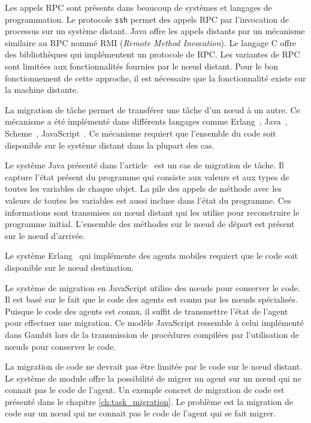 Les appels RPC sont présents dans beaucoup de systèmes et langages de
programmation.  Le protocole \texttt{ssh} permet des appels RPC par
l'invocation de processus sur un système distant. Java offre les appels distants par un
mécanisme similaire au RPC nommé RMI (\textit{Remote Method Invocation}).
Le langage C offre des bibliothèques qui implémentent un protocole de RPC.
Les variantes de RPC sont limitées aux fonctionnalités fournies par le nœud distant.
Pour le bon fonctionnement de cette approche, il est nécessaire que la
fonctionnalité existe sur la machine distante.

La migration de tâche permet de transférer une tâche d'un nœud à un autre.  Ce
mécanisme a été implémenté dans différents langages comme
Erlang~\cite{M_mobileintelligent}, Java~\cite{And98transparentmigration},
Scheme~\cite{Sumii00animplementation},
JavaScript~\cite{DEV2017transparentmigration}. Ce mécanisme requiert que
l'ensemble du code soit disponible sur le système distant dans la plupart des
cas.

Le système Java présenté dans l'article~\cite{And98transparentmigration} est un
cas de migration de tâche. Il capture l'état présent du programme qui consiste
aux valeurs et aux types de toutes les variables de chaque objet. La pile des
appels de méthode avec les valeurs de toutes les
variables est aussi incluse dans l'état du programme.
Ces informations sont transmises au nœud distant qui les utilise pour reconstruire le programme initial.
L'ensemble des méthodes sur le nœud de départ est présent sur le
nœud d'arrivée.

Le système Erlang~\cite{M_mobileintelligent} qui implémente des agents mobiles
requiert que le code soit disponible sur le nœud destination.

Le système de migration en JavaScript utilise des nœuds pour conserver
le code. Il est basé sur le fait que le code des agents est connu par les
nœuds spécialisés. Puisque le code des agents est connu, il suffit de
transmettre l'état de l'agent pour effectuer une migration. Ce modèle
JavaScript ressemble à celui implémenté dans Gambit lors de la transmission
de procédures compilées par l'utilisation de nœuds pour conserver le code.

La migration de code ne devrait pas être limitée par le code sur le nœud
distant. Le système de module offre la possibilité de migrer un agent sur un
nœud qui ne connait pas le code de l'agent. Un exemple concret de migration
de code est présenté dans le chapitre \ref{ch:task_migration}. Le problème
est la migration de code sur un nœud qui ne connait pas le code de l'agent qui
se fait migrer.

